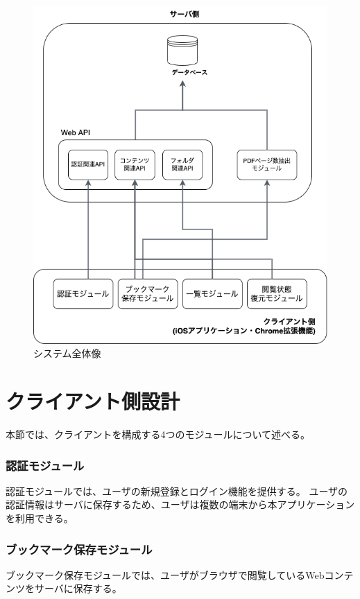 \begin{figure}[htbp]
  \caption{システム全体像}
  \label{fig:design-system-overall}
  \begin{center}
    \includegraphics[bb=0 0 592 681,width=15cm]{img/040_design/design-system-overall.pdf}
  \end{center}
\end{figure}

\section{クライアント側設計}
本節では、クライアントを構成する4つのモジュールについて述べる。

\subsubsection{認証モジュール}
認証モジュールでは、ユーザの新規登録とログイン機能を提供する。
ユーザの認証情報はサーバに保存するため、ユーザは複数の端末から本アプリケーションを利用できる。

\subsubsection{ブックマーク保存モジュール}
ブックマーク保存モジュールでは、ユーザがブラウザで閲覧しているWebコンテンツをサーバに保存する。

